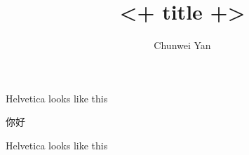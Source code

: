 \documentclass[a4paper]{article}
\author{Chunwei Yan}
\title{<+ title +>}
\begin{document}
    \maketitle

\Large {}
Helvetica looks like this

\Large 你好








Helvetica looks like this

\end{document}
